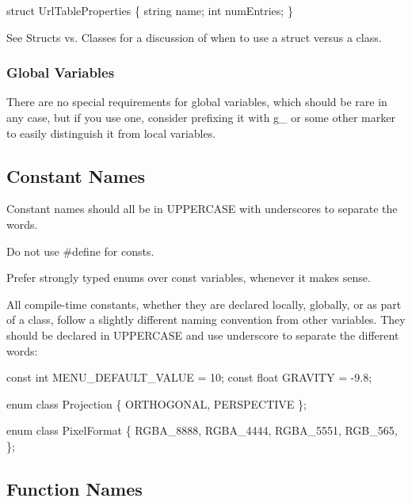 \begin{DoxyCode}
\textcolor{keyword}{struct }UrlTableProperties \{
  \textcolor{keywordtype}{string} name;
  \textcolor{keywordtype}{int} numEntries;
\}
\end{DoxyCode}


See Structs vs. Classes for a discussion of when to use a struct versus a class.

\subsubsection*{Global Variables}

There are no special requirements for global variables, which should be rare in any case, but if you use one, consider prefixing it with {\ttfamily g\+\_\+} or some other marker to easily distinguish it from local variables.

\subsection*{Constant Names}

Constant names should all be in U\+P\+P\+E\+R\+C\+A\+SE with underscores to separate the words.

Do not use {\ttfamily \#define} for consts.

Prefer strongly typed enums over {\ttfamily const} variables, whenever it makes sense.

All compile-\/time constants, whether they are declared locally, globally, or as part of a class, follow a slightly different naming convention from other variables. They should be declared in U\+P\+P\+E\+R\+C\+A\+SE and use underscore to separate the different words\+:


\begin{DoxyCode}
\textcolor{keyword}{const} \textcolor{keywordtype}{int} MENU\_DEFAULT\_VALUE = 10;
\textcolor{keyword}{const} \textcolor{keywordtype}{float} GRAVITY = -9.8;

\textcolor{keyword}{enum class} Projection \{
  ORTHOGONAL,
  PERSPECTIVE
\};

\textcolor{keyword}{enum class} PixelFormat \{
  RGBA\_8888,
  RGBA\_4444,
  RGBA\_5551,
  RGB\_565,
\};
\end{DoxyCode}


\subsection*{Function Names}

